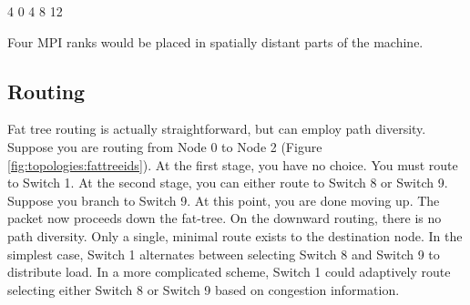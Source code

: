 \begin{ViFile}
4
0
4
8
12
\end{ViFile}
Four MPI ranks would be placed in spatially distant parts of the machine.

\subsection{Routing}
Fat tree routing is actually straightforward, but can employ path diversity.
Suppose you are routing from Node 0 to Node 2 (Figure \ref{fig:topologies:fattreeids}).
At the first stage, you have no choice.
You must route to Switch 1.
At the second stage, you can either route to Switch 8 or Switch 9.
Suppose you branch to Switch 9. 
At this point, you are done moving up.
The packet now proceeds down the fat-tree.
On the downward routing, there is no path diversity.
Only a single, minimal route exists to the destination node.
In the simplest case, Switch 1 alternates between selecting Switch 8 and Switch 9 to distribute load.
In a more complicated scheme, Switch 1 could adaptively route selecting either Switch 8 or Switch 9 based on congestion information.
